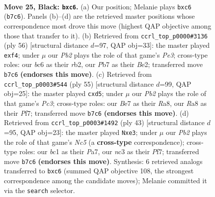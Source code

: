\documentclass[11pt]{article}
\begin{document}
\clearpage

\begin{figure}[p]\centering
\begin{subfigure}{0.46\textwidth}\centering
\resizebox{\linewidth}{!}{%
\newchessgame
\chessboard[
  setfen={r3k3/pp2br1R/2B3p1/6P1/P7/2N2N2/1P3P2/R1B1K3 b Q - 0 25},
  showmover=false,
  pgfstyle=straightmove, color=movearrow, markmove={b7-c6}
]}
\caption{}
\end{subfigure}\hfill
\begin{subfigure}{0.46\textwidth}\centering
\resizebox{\linewidth}{!}{%
\newchessgame
\chessboard[
  setfen={6k1/B3pp1p/1p2n1p1/3n4/5b2/4P3/1r2BKPP/2R4R w - - 0 29},
  showmover=false,
  pgfstyle=straightmove, color=movearrow, markmove={e3-f4}
]}
\caption{}
\end{subfigure}
\\[4pt]
\begin{subfigure}{0.46\textwidth}\centering
\resizebox{\linewidth}{!}{%
\newchessgame
\chessboard[
  setfen={rr6/3k1p2/2p4p/P2B2p1/1P6/2B1KP2/5P1P/R7 b - - 0 28},
  showmover=false,
  pgfstyle=straightmove, color=movearrow, markmove={c6-d5}
]}
\caption{}
\end{subfigure}\hfill
\begin{subfigure}{0.46\textwidth}\centering
\resizebox{\linewidth}{!}{%
\newchessgame
\chessboard[
  setfen={2rbr1k1/pR3pp1/7p/3N4/2n1PP2/P3B3/4KP2/2R5 b - - 3 22},
  showmover=false,
  pgfstyle=straightmove, color=movearrow, markmove={c4-e3}
]}
\caption{}
\end{subfigure}
\caption{\textbf{Move 25, Black: \texttt{bxc6}.} (a) Our position; Melanie plays \texttt{bxc6} (\texttt{b7c6}). Panels (b)--(d) are the retrieved master positions whose correspondence most drove this move (highest QAP objective among those that transfer to it). (b) Retrieved from \texttt{ccrl\_top\_p0000\#3136} (ply 56) [structural distance $d$=97, QAP obj=33]: the master played \texttt{exf4}; under $\mu$ our \emph{Pb2} plays the role of that game's \emph{Pe3}; cross-type roles: our \emph{b}c6 as their \emph{r}b2, our \emph{P}b7 as their \emph{B}e2; transferred move \texttt{b7c6} \textbf{(endorses this move)}. (c) Retrieved from \texttt{ccrl\_top\_p0003\#544} (ply 55) [structural distance $d$=99, QAP obj=25]: the master played \texttt{cxd5}; under $\mu$ our \emph{Pb2} plays the role of that game's \emph{Pc3}; cross-type roles: our \emph{B}e7 as their \emph{R}a8, our \emph{R}a8 as their \emph{P}f7; transferred move \texttt{b7c6} \textbf{(endorses this move)}. (d) Retrieved from \texttt{ccrl\_top\_p0003\#1492} (ply 43) [structural distance $d$=95, QAP obj=23]: the master played \texttt{Nxe3}; under $\mu$ our \emph{Pb2} plays the role of that game's \emph{Nc5} (a \textbf{cross-type} correspondence); cross-type roles: our \emph{b}c1 as their \emph{P}a7, our \emph{n}c3 as their \emph{P}f7; transferred move \texttt{b7c6} \textbf{(endorses this move)}. Synthesis: 6 retrieved analogs transferred to \texttt{bxc6} (summed QAP objective 108, the strongest correspondence among the candidate moves); Melanie committed it via the \texttt{search} selector.}
\label{fig:thought-m49}
\end{figure}
\end{document}
